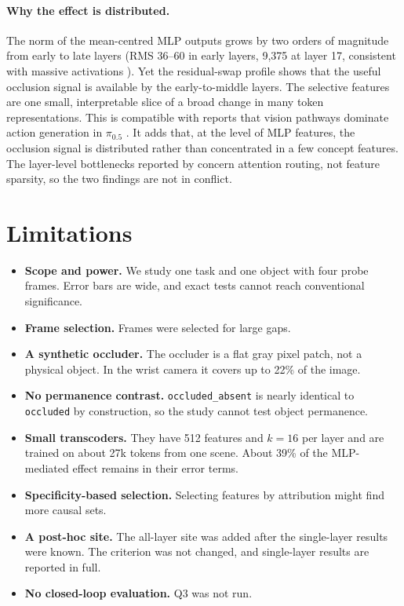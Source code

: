 \documentclass{article} %
\newcommand{\pifive}{$\pi_{0.5}$}
\newcommand{\occ}{\texttt{occluded}}
\newcommand{\cond}[1]{\texttt{#1}}
\begin{document}
\paragraph{Why the effect is distributed.} The norm of the mean-centred MLP outputs grows by two orders of magnitude from early to late layers (RMS 36--60 in early layers, 9,375 at layer 17, consistent with massive activations \citep{sun2024massive}). Yet the residual-swap profile shows that the useful occlusion signal is available by the early-to-middle layers. The selective features are one small, interpretable slice of a broad change in many token representations. This is compatible with reports that vision pathways dominate action generation in \pifive{} \citep{grant2026features}. It adds that, at the level of MLP features, the occlusion signal is distributed rather than concentrated in a few concept features. The layer-level bottlenecks reported by \citet{shi2026vlatrace} concern attention routing, not feature sparsity, so the two findings are not in conflict.

\section{Limitations}
\label{sec:limitations}
\begin{itemize}[leftmargin=*,itemsep=1pt,topsep=2pt]
  \item \textbf{Scope and power.} We study one task and one object with four probe frames. Error bars are wide, and exact tests cannot reach conventional significance.
  \item \textbf{Frame selection.} Frames were selected for large gaps.
  \item \textbf{A synthetic occluder.} The occluder is a flat gray pixel patch, not a physical object. In the wrist camera it covers up to 22\% of the image.
  \item \textbf{No permanence contrast.} \cond{occluded\_absent} is nearly identical to \occ{} by construction, so the study cannot test object permanence.
  \item \textbf{Small transcoders.} They have 512 features and $k{=}16$ per layer and are trained on about 27k tokens from one scene. About 39\% of the MLP-mediated effect remains in their error terms.
  \item \textbf{Specificity-based selection.} Selecting features by attribution might find more causal sets.
  \item \textbf{A post-hoc site.} The all-layer site was added after the single-layer results were known. The criterion was not changed, and single-layer results are reported in full.
  \item \textbf{No closed-loop evaluation.} Q3 was not run.
\end{itemize}
\end{document}
